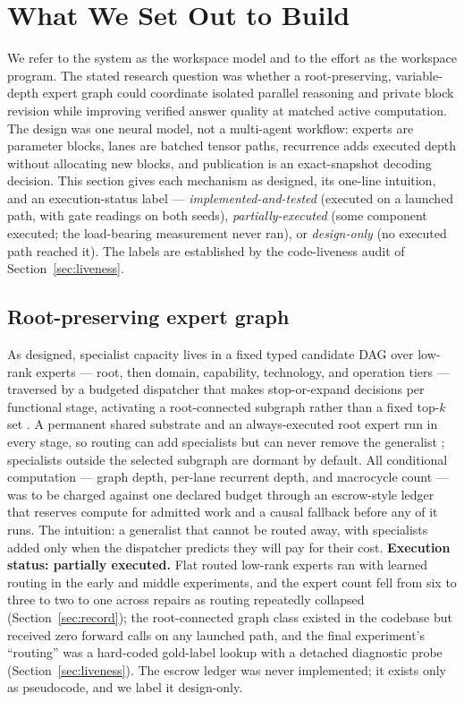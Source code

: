 \documentclass[10pt,a4paper]{article}
\begin{document}
\section{What We Set Out to Build}
\label{sec:design}

We refer to the system as the workspace model and to the effort as the
workspace program. The stated research question was whether a
root-preserving, variable-depth expert graph could coordinate isolated
parallel reasoning and private block revision while improving verified
answer quality at matched active computation. The design was one neural
model, not a multi-agent workflow: experts are parameter blocks, lanes are
batched tensor paths, recurrence adds executed depth without allocating new
blocks, and publication is an exact-snapshot decoding decision. This section
gives each mechanism as designed, its one-line intuition, and an
execution-status label --- \emph{implemented-and-tested} (executed on a
launched path, with gate readings on both seeds), \emph{partially-executed}
(some component executed; the load-bearing measurement never ran), or
\emph{design-only} (no executed path reached it). The labels are established
by the code-liveness audit of Section~\ref{sec:liveness}.

\subsection{Root-preserving expert graph}

As designed, specialist capacity lives in a fixed typed candidate DAG over
low-rank experts --- root, then domain, capability, technology, and operation
tiers --- traversed by a budgeted dispatcher that makes stop-or-expand
decisions per functional stage, activating a root-connected subgraph rather
than a fixed top-$k$ set
\cite{jordan1994,shazeer2017,rosenbaum2018,tang2020ple}. A permanent shared
substrate and an always-executed root expert run in every stage, so routing
can add specialists but can never remove the generalist
\cite{rajbhandari2022,dai2024}; specialists outside the selected subgraph
are dormant by default. All conditional computation --- graph depth, per-lane
recurrent depth, and macrocycle count --- was to be charged against one
declared budget through an escrow-style ledger that reserves compute for
admitted work and a causal fallback before any of it runs. The intuition: a
generalist that cannot be routed away, with specialists added only when the
dispatcher predicts they will pay for their cost. \textbf{Execution status:
partially executed.} Flat routed low-rank experts ran with learned routing in
the early and middle experiments, and the expert count fell from six to
three to two to one across repairs as routing repeatedly collapsed
(Section~\ref{sec:record}); the root-connected graph class existed in the
codebase but received zero forward calls on any launched path, and the final
experiment's ``routing'' was a hard-coded gold-label lookup with a detached
diagnostic probe (Section~\ref{sec:liveness}). The escrow ledger was never
implemented; it exists only as pseudocode, and we label it design-only.
\end{document}
